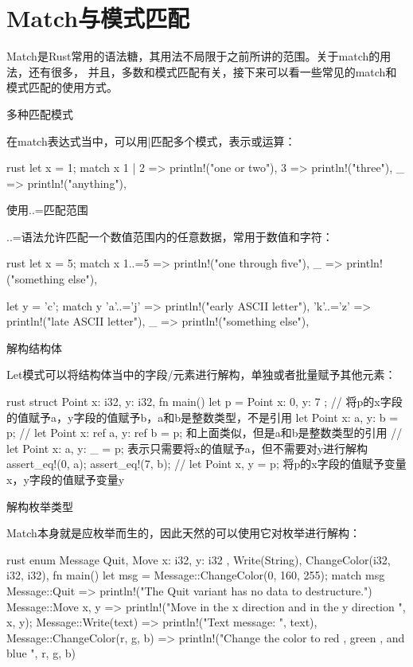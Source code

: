 \section{Match与模式匹配}
Match是Rust常用的语法糖，其用法不局限于之前所讲的范围。关于match的用法，还有很多，
并且，多数和模式匹配有关，接下来可以看一些常见的match和模式匹配的使用方式。
\begin{outline}[enumerate]
\1 多种匹配模式

在match表达式当中，可以用|匹配多个模式，表示或运算：
\begin{code-in-enumerate}{rust}
let x = 1;
match x {
    1 | 2 => println!("one or two"),
    3 => println!("three"),
    _ => println!("anything"),
}
\end{code-in-enumerate}

\1 使用..=匹配范围

..=语法允许匹配一个数值范围内的任意数据，常用于数值和字符：
\begin{code-in-enumerate}{rust}
let x = 5;
match x {
    1..=5 => println!("one through five"),
    _ => println!("something else"),
}

let y = 'c';
match y {
    'a'..='j' => println!("early ASCII letter"),
    'k'..='z' => println!("late ASCII letter"),
    _ => println!("something else"),
}
\end{code-in-enumerate}

\1 解构结构体

Let模式可以将结构体当中的字段/元素进行解构，单独或者批量赋予其他元素：
\begin{code-in-enumerate}{rust}
struct Point {
    x: i32,
    y: i32,
}
fn main() {
    let p = Point { x: 0, y: 7 };
    // 将p的x字段的值赋予a，y字段的值赋予b，a和b是整数类型，不是引用
    let Point { x: a, y: b } = p;
    // let Point {x: ref a, y: ref b} = p; 和上面类似，但是a和b是整数类型的引用
    // let Point {x: a, y: _} = p; 表示只需要将x的值赋予a，但不需要对y进行解构
    assert_eq!(0, a);
    assert_eq!(7, b);
    // let Point {x, y} = p; 将p的x字段的值赋予变量x，y字段的值赋予变量y
}
\end{code-in-enumerate}

\1 解构枚举类型

Match本身就是应枚举而生的，因此天然的可以使用它对枚举进行解构：
\begin{code-in-enumerate}{rust}
enum Message {
    Quit,
    Move { x: i32, y: i32 },
    Write(String),
    ChangeColor(i32, i32, i32),
}
fn main() {
    let msg = Message::ChangeColor(0, 160, 255);
    match msg {
        Message::Quit => {
            println!("The Quit variant has no data to destructure.")
        }
        Message::Move { x, y } => {
            println!("Move in the x direction {} and in the y direction {}", x, y);
        }
        Message::Write(text) => println!("Text message: {}", text),
        Message::ChangeColor(r, g, b) => {
            println!("Change the color to red {}, green {}, and blue {}", r, g, b)
        }
    }
}
\end{code-in-enumerate}


\end{outline}
